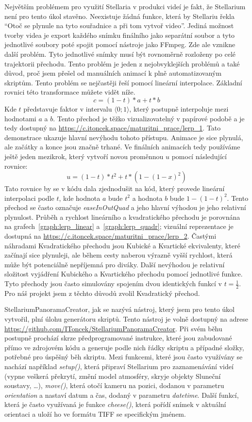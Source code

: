 \documentclass[12pt,a4paper,titlepage]{article}
\begin{document}
Největším problémem pro využití Stellaria v produkci videí je fakt, že Stellarium není pro tento úkol stavěno. Neexistuje žádná funkce, která by Stellariu řekla \enquote{Otoč se plynule na tyto souřadnice a při tom vytvoř video}. Jediná možnost tvorby videa je export každého snímku finálního jako separátní soubor a tyto jednotlivé soubory poté spojit pomocí nástroje jako FFmpeg. Zde ale vznikne další problém. Tyto jednotlivé snímky musí být rovnoměrně rozloženy po celé trajektorii přechodu. Tento problém je jeden z nejobvyklejších problémů a také důvod, proč jsem přešel od manuálních animací k plně automatizovaným skriptům. Tento problém se nejčastěji řeší pomocí lineární interpolace. Základní rovnici této transformace můžete vidět níže.
\[c = (1-t)*a + t * b\] 
Kde $t$ představuje faktor v intervalu $\langle0;1\rangle$, který postupně interpoluje mezi hodnotami $a$ a $b$. Tento přechod je těžko vizualizovatelný v papírové podobě a je tedy dostupný na \url{https://c.itoncek.space/maturitni_prace/lerp_1}. Tato demonstrace ukazuje hlavní nevýhodu tohoto přístupu. Animace je sice plynulá, ale začátky a konce jsou značně trhané. Ve finálních animacích tedy používáme ještě jeden mezikrok, který vytvoří novou proměnnou $u$ pomocí následující rovnice:
\[u = (1 - t) * t^2 + t * (1-{(1-x)}^{2})\]
Tato rovnice by se v kódu dala zjednodušit na kód, který provede lineární interpolaci podle $t$, kde hodnota $a$ bude $t^{2}$ a hodnota $b$ bude $1-{(1-t)}^{2}$. Tento přechod se často označuje \textit{easeInOutQuad} a jeho hlavní výhodou je jeho relativní plynulost. Průběh a rychlost lineárního a kvadratického přechodu je porovnána na grafech~\ref{graph:lerp_linear} a~\ref{graph:lerp_quadr}; vizuální reprezentace je dostupná na \url{https://c.itoncek.space/maturitni_prace/lerp_2}. Častými náhradami Kvadratického přechodu jsou Kubické a Kvartické ekvivalenty, které začínají sice plynuleji, ale během cesty naberou výrazně vyšší rychlost, která může být potenciálně nepříjemná pro diváky. Další nevýhodou je relativní složitost vyjádření Kubického a Kvartického přechodu pomocí jednotlivé funkce. Tyto přechody jsou často simulovány spojením dvou identických funkcí v $t=\frac{1}{2}$. Pro náš projekt jsem z těchto důvodů zvolil Kvadratický přechod.

StellariumPanoramaCreator, jak se nazývá nástroj, který jsem pro tento úkol vytvořil, plní úlohu generátoru skriptů. Tento nástroj je volně dostupný na adrese \url{https://github.com/IToncek/StellariumPanoramaCreator}. Při svém běhu postupně prochází skrze předprogramované instrukce, které jsou zabudované přímo ve zdrojovém kódu a generuje podle nich řádky skriptu a případné složky, potřebné pro úspěšný běh skriptu. Mezi funkcemi, které jsou často využívány se nachází například \textit{setup()}, která připraví Stellarium pro zaznamenávání videí (vypne veškerá překrytí, změní model atmosféry, skryje objekty Sluneční soustavy, \ldots), \textit{move()}, která otočí kameru na pozici, dodanou v parametru \textit{orientation} a nastaví datum a čas, dodaný v parametru \textit{datetime}. Další funkcí, která je často využívaná je funkce \textit{cheese()}, která pořídí snímek v aktuální orientaci a uloží ho ve formátu TIFF se specifickým jménem. %
\end{document}
